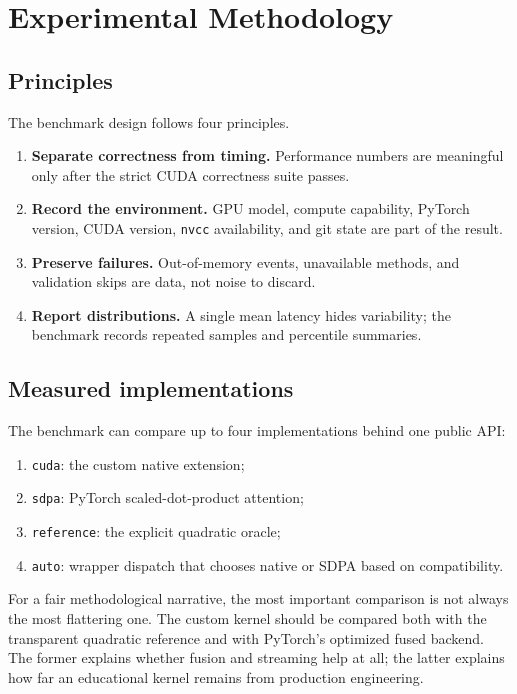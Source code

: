 \chapter{Experimental Methodology}
\label{chap:methodology}

\section{Principles}

The benchmark design follows four principles.

\begin{enumerate}
  \item \textbf{Separate correctness from timing.} Performance numbers are meaningful only after the strict CUDA correctness suite passes.
  \item \textbf{Record the environment.} GPU model, compute capability, PyTorch version, CUDA version, \texttt{nvcc} availability, and git state are part of the result.
  \item \textbf{Preserve failures.} Out-of-memory events, unavailable methods, and validation skips are data, not noise to discard.
  \item \textbf{Report distributions.} A single mean latency hides variability; the benchmark records repeated samples and percentile summaries.
\end{enumerate}

\section{Measured implementations}

The benchmark can compare up to four implementations behind one public API:
\begin{enumerate}
  \item \texttt{cuda}: the custom native extension;
  \item \texttt{sdpa}: PyTorch scaled-dot-product attention;
  \item \texttt{reference}: the explicit quadratic oracle;
  \item \texttt{auto}: wrapper dispatch that chooses native or SDPA based on compatibility.
\end{enumerate}

For a fair methodological narrative, the most important comparison is not always the most flattering one. The custom kernel should be compared both with the transparent quadratic reference and with PyTorch's optimized fused backend. The former explains whether fusion and streaming help at all; the latter explains how far an educational kernel remains from production engineering.

